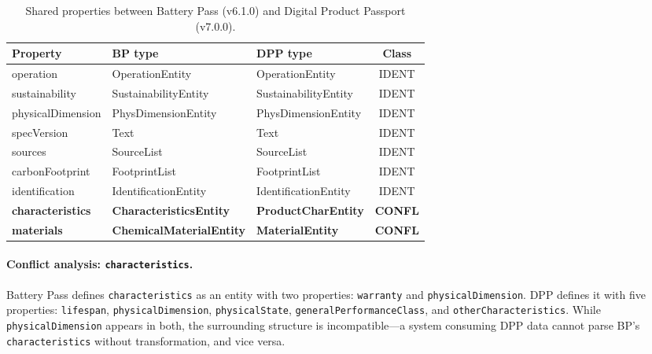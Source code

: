 \documentclass[]{ceurart}
\begin{document}
\begin{table}[h]
  \caption{Shared properties between Battery Pass (v6.1.0) and Digital
    Product Passport (v7.0.0).}
  \label{tab:bp-dpp}
  \begin{tabular}{lllc}
    \toprule
    Property & BP type & DPP type & Class \\
    \midrule
    operation       & OperationEntity       & OperationEntity       & IDENT \\
    sustainability  & SustainabilityEntity  & SustainabilityEntity  & IDENT \\
    physicalDimension & PhysDimensionEntity & PhysDimensionEntity   & IDENT \\
    specVersion     & Text                  & Text                  & IDENT \\
    sources         & SourceList            & SourceList            & IDENT \\
    carbonFootprint & FootprintList         & FootprintList         & IDENT \\
    identification  & IdentificationEntity  & IdentificationEntity  & IDENT \\
    \textbf{characteristics} & \textbf{CharacteristicsEntity} & \textbf{ProductCharEntity} & \textbf{CONFL} \\
    \textbf{materials}       & \textbf{ChemicalMaterialEntity} & \textbf{MaterialEntity} & \textbf{CONFL} \\
    \bottomrule
  \end{tabular}
\end{table}

\paragraph{Conflict analysis: \texttt{characteristics}.}
Battery Pass defines \texttt{characteristics} as an entity with two
properties: \texttt{warranty} and \texttt{physicalDimension}. DPP defines
it with five properties: \texttt{lifespan}, \texttt{physicalDimension},
\texttt{physicalState}, \texttt{generalPerformanceClass}, and
\texttt{otherCharacteristics}. While \texttt{physicalDimension} appears in
both, the surrounding structure is incompatible---a system consuming DPP
data cannot parse BP's \texttt{characteristics} without transformation, and
vice versa.
\end{document}
